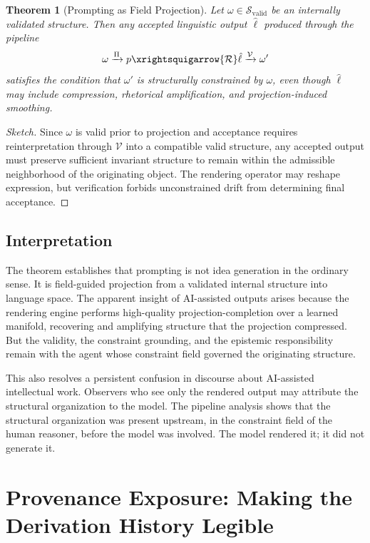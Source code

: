 \documentclass[12pt, a4paper]{article}
\theoremstyle{plain}
\newtheorem{theorem}{Theorem}[section]
\theoremstyle{definition}
\theoremstyle{remark}
\begin{document}
\begin{theorem}[Prompting as Field Projection]
\label{thm:prompting}
Let $\omega \in \mathcal{S}_{\mathrm{valid}}$ be an internally validated structure. Then any accepted linguistic output $\hat{\ell}$ produced through the pipeline
\[
\omega \xrightarrow{\Pi} p \xrightsquigarrow{\mathcal{R}} \hat{\ell} \xrightarrow{\mathcal{V}} \omega'
\]
satisfies the condition that $\omega'$ is structurally constrained by $\omega$, even though $\hat{\ell}$ may include compression, rhetorical amplification, and projection-induced smoothing.
\end{theorem}

\begin{proof}[Sketch]
Since $\omega$ is valid prior to projection and acceptance requires reinterpretation through $\mathcal{V}$ into a compatible valid structure, any accepted output must preserve sufficient invariant structure to remain within the admissible neighborhood of the originating object. The rendering operator may reshape expression, but verification forbids unconstrained drift from determining final acceptance.
\end{proof}

\subsection{Interpretation}

The theorem establishes that prompting is not idea generation in the ordinary sense. It is field-guided projection from a validated internal structure into language space. The apparent insight of AI-assisted outputs arises because the rendering engine performs high-quality projection-completion over a learned manifold, recovering and amplifying structure that the projection compressed. But the validity, the constraint grounding, and the epistemic responsibility remain with the agent whose constraint field governed the originating structure.

This also resolves a persistent confusion in discourse about AI-assisted intellectual work. Observers who see only the rendered output may attribute the structural organization to the model. The pipeline analysis shows that the structural organization was present upstream, in the constraint field of the human reasoner, before the model was involved. The model rendered it; it did not generate it.

\section{Provenance Exposure: Making the Derivation History Legible}
\end{document}
